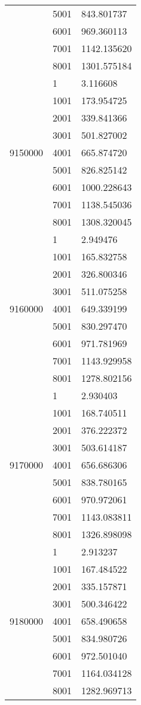 \begin{table}[htb!]
\begin{tabular}{lll}
 & 5001 & 843.801737 \\
 & 6001 & 969.360113 \\
 & 7001 & 1142.135620 \\
 & 8001 & 1301.575184 \\
\multirow[c]{9}{*}{9150000} & 1 & 3.116608 \\
 & 1001 & 173.954725 \\
 & 2001 & 339.841366 \\
 & 3001 & 501.827002 \\
 & 4001 & 665.874720 \\
 & 5001 & 826.825142 \\
 & 6001 & 1000.228643 \\
 & 7001 & 1138.545036 \\
 & 8001 & 1308.320045 \\
\multirow[c]{9}{*}{9160000} & 1 & 2.949476 \\
 & 1001 & 165.832758 \\
 & 2001 & 326.800346 \\
 & 3001 & 511.075258 \\
 & 4001 & 649.339199 \\
 & 5001 & 830.297470 \\
 & 6001 & 971.781969 \\
 & 7001 & 1143.929958 \\
 & 8001 & 1278.802156 \\
\multirow[c]{9}{*}{9170000} & 1 & 2.930403 \\
 & 1001 & 168.740511 \\
 & 2001 & 376.222372 \\
 & 3001 & 503.614187 \\
 & 4001 & 656.686306 \\
 & 5001 & 838.780165 \\
 & 6001 & 970.972061 \\
 & 7001 & 1143.083811 \\
 & 8001 & 1326.898098 \\
\multirow[c]{9}{*}{9180000} & 1 & 2.913237 \\
 & 1001 & 167.484522 \\
 & 2001 & 335.157871 \\
 & 3001 & 500.346422 \\
 & 4001 & 658.490658 \\
 & 5001 & 834.980726 \\
 & 6001 & 972.501040 \\
 & 7001 & 1164.034128 \\
 & 8001 & 1282.969713 \\

\end{tabular}
\end{table}
